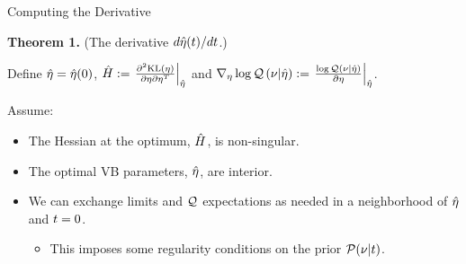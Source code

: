 \begin{frame}{Computing the Derivative \citep{giordano:2018:covariances}}

\textbf{Theorem 1.} (The derivative $d\hat\eta(t) / dt$.)  

 {
Define $\hat\eta = \hat\eta(0)$, $\hat{H} := \left.\frac{\partial^2 \mathrm{KL}\left(\eta\right)}{\partial \eta \partial \eta^T}\right\vert_{\hat\eta}$ and 
${\nabla_\eta \log \mathcal{Q}}\left(\nu \vert \hat\eta\right) :=
    \left.\frac{\log \mathcal{Q}(\nu \vert \hat\eta)}{\partial \eta}\right\vert_{\hat\eta}$.
}

Assume:
\begin{itemize}
    \item<3-> The Hessian at the optimum, $\hat{H}$, is non-singular. %
    \item<4-> The optimal VB parameters, $\hat\eta$, are interior. %
    \item<5-> We can exchange limits and $\mathcal{Q}$ expectations as needed in a 
        neighborhood of $\hat\eta$ and $t=0$.  %
    \begin{itemize}
        \item This imposes some regularity conditions on the prior $\mathcal{P}(\nu \vert t)$.
    \end{itemize}
\end{itemize}



\end{frame}

